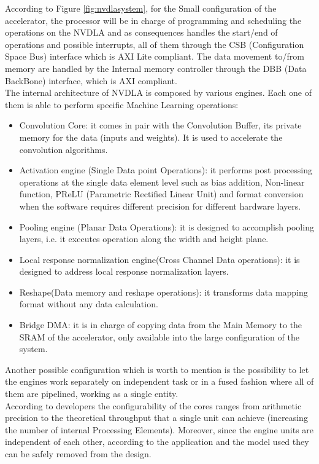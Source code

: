 According to Figure \ref{fig:nvdlasystem}, for the Small configuration of the accelerator, the processor will be in charge of programming and scheduling the operations on the NVDLA and as consequences handles the start/end of operations and possible interrupts, all of them through the CSB (Configuration Space Bus) interface which is AXI Lite compliant\cite{paper:30}. \newline
The data movement to/from memory are handled by the Internal memory controller through the DBB (Data BackBone) interface, which is AXI \cite{paper:30} compliant.\\

The internal architecture of NVDLA is composed by various engines. Each one of them is able to perform specific Machine Learning operations:
\begin{itemize}
\item Convolution Core: it comes in pair with the Convolution Buffer, its private memory for the data (inputs and weights). It is used to accelerate the convolution algorithms.
\item Activation engine (Single Data point Operations): it performs post processing operations at the single data element level such as bias addition, Non-linear function, PReLU (Parametric Rectified Linear Unit) and format conversion when the software requires different precision for different hardware layers.
\item Pooling engine (Planar Data Operations): it is designed to accomplish pooling layers, i.e. it executes operation along the width and height plane.
\item Local response normalization engine(Cross Channel Data operations): it is designed to address local response normalization layers.
\item Reshape(Data memory and reshape operations): it transforms data mapping format without any data calculation.
\item Bridge DMA: it is in charge of copying data from the Main Memory to the SRAM of the accelerator, only available into the large configuration of the system.
\end{itemize}

Another possible configuration which is worth to mention is the possibility to let the engines work separately on independent task or in a fused fashion where all of them are pipelined, working as a single entity.\\

According to developers the configurability of the cores ranges from arithmetic precision to the theoretical throughput that a single unit can achieve (increasing the number of internal Processing Elements). Moreover, since the engine units are independent of each other, according to the application and the model used they can be safely removed from the design.
\newpage
